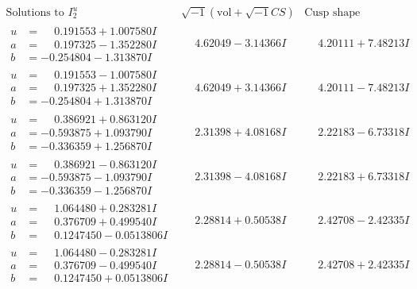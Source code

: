 \documentclass[1p]{elsarticle_modified}
\theoremstyle{definition}
\newcommand{\I}{\sqrt{-1}}
\begin{document}
$$\begin{array}{c|c|c}  
\text{Solutions to }I^u_{2}& \I (\text{vol} + \sqrt{-1}CS) & \text{Cusp shape}\\
 \hline 
\begin{aligned}
u &= \phantom{-}0.191553 + 1.007580 I \\
a &= \phantom{-}0.197325 - 1.352280 I \\
b &= -0.254804 - 1.313870 I\end{aligned}
 & \phantom{-}4.62049 - 3.14366 I & \phantom{-}4.20111 + 7.48213 I \\ \hline\begin{aligned}
u &= \phantom{-}0.191553 - 1.007580 I \\
a &= \phantom{-}0.197325 + 1.352280 I \\
b &= -0.254804 + 1.313870 I\end{aligned}
 & \phantom{-}4.62049 + 3.14366 I & \phantom{-}4.20111 - 7.48213 I \\ \hline\begin{aligned}
u &= \phantom{-}0.386921 + 0.863120 I \\
a &= -0.593875 + 1.093790 I \\
b &= -0.336359 + 1.256870 I\end{aligned}
 & \phantom{-}2.31398 + 4.08168 I & \phantom{-}2.22183 - 6.73318 I \\ \hline\begin{aligned}
u &= \phantom{-}0.386921 - 0.863120 I \\
a &= -0.593875 - 1.093790 I \\
b &= -0.336359 - 1.256870 I\end{aligned}
 & \phantom{-}2.31398 - 4.08168 I & \phantom{-}2.22183 + 6.73318 I \\ \hline\begin{aligned}
u &= \phantom{-}1.064480 + 0.283281 I \\
a &= \phantom{-}0.376709 + 0.499540 I \\
b &= \phantom{-}0.1247450 - 0.0513806 I\end{aligned}
 & \phantom{-}2.28814 + 0.50538 I & \phantom{-}2.42708 - 2.42335 I \\ \hline\begin{aligned}
u &= \phantom{-}1.064480 - 0.283281 I \\
a &= \phantom{-}0.376709 - 0.499540 I \\
b &= \phantom{-}0.1247450 + 0.0513806 I\end{aligned}
 & \phantom{-}2.28814 - 0.50538 I & \phantom{-}2.42708 + 2.42335 I \\ \hline\begin{aligned}

\end{aligned}
\end{array}$$
\end{document}
